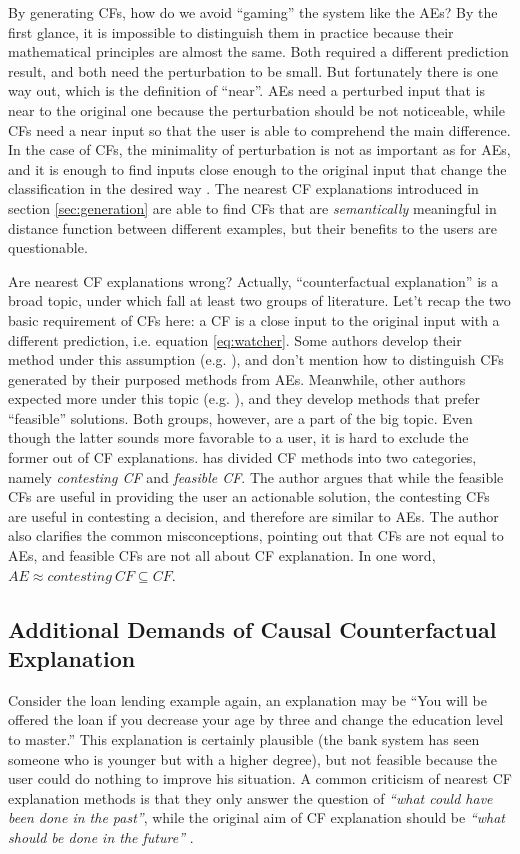 By generating CFs, how do we avoid  ``gaming'' the system like the AEs? By the first glance, it is impossible to distinguish them in practice because their mathematical principles are almost the same. Both required a different prediction result, and both need the perturbation to be small. But fortunately there is one way out, which is the definition of ``near''. AEs need a perturbed input that is near to the original one because the perturbation should be not noticeable, while CFs need a near input so that the user is able to comprehend the main difference. In the case of CFs, the minimality of perturbation is not as important as for AEs, and it is enough to find inputs close enough to the original input that change the classification in the desired way \cite{CFandAE}. The nearest CF explanations introduced in section \ref{sec:generation} are able to find CFs that are \emph{semantically} meaningful in distance function between different examples, but their benefits to the users are questionable.

Are nearest CF explanations wrong? Actually, ``counterfactual explanation'' is a broad topic, under which fall at least two groups of literature. Let't recap the two basic requirement of CFs here: a CF is a close input to the original input with a different prediction, i.e. equation \ref{eq:watcher}. Some authors develop their method under this assumption (e.g. \cite{certifai,watcher2017,DiCE}), and don't mention how to distinguish CFs generated by their purposed methods from AEs. Meanwhile, other authors expected more under this topic (e.g. \cite{prototype}), and they develop methods that prefer ``feasible'' solutions. Both groups, however, are a part of the big topic. Even though the latter sounds more favorable to a user, it is hard to exclude the former out of CF explanations. \citeauthor{CFandAE} \cite{CFandAE} has divided CF methods into two categories, namely \emph{contesting CF} and \emph{feasible CF}. The author argues that while the feasible CFs are useful in providing the user an actionable solution, the contesting CFs are useful in contesting a decision, and therefore are similar to AEs. The author also clarifies the common misconceptions, pointing out that CFs are not equal to AEs, and feasible CFs are not all about CF explanation. In one word, $AE\approx contesting\ CF\subseteq CF$.
 \subsection{Additional Demands of Causal Counterfactual Explanation}
Consider the loan lending example again, an explanation may be ``You will be offered the loan if you decrease your age by three and change the education level to master.'' This explanation is certainly plausible (the bank system has seen someone who is younger but with a higher degree), but not feasible because the user could do nothing to improve his situation. A common criticism of nearest CF explanation methods is that they only answer the question of \emph{``what could have been done in the past''}, while the original aim of CF explanation should be \emph{``what should be done in the future''} \cite{algorithmicrecourse}.

